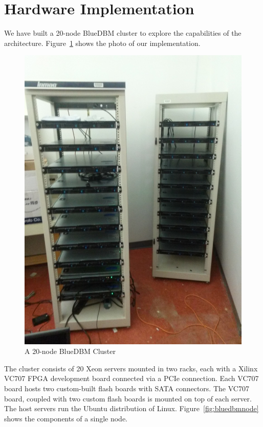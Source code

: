 \section{Hardware Implementation}

We have built a 20-node BlueDBM cluster to explore the capabilities of the
architecture. Figure~\ref{fig:bluedbmcluster} shows the photo of our
implementation.

\begin{figure}[ht]
	\begin{center}
	\includegraphics[width=0.3\paperwidth]{figures/rack.jpg}
	\caption{A 20-node BlueDBM Cluster}
	\label{fig:bluedbmcluster}
	\end{center}
\end{figure}

The cluster consists of 20 Xeon servers mounted in two racks, each with a Xilinx
VC707 FPGA development board connected via a PCIe connection. Each VC707 board
hosts two custom-built flash boards with SATA connectors. The VC707 board,
coupled with two custom flash boards is mounted on top of each server.
The host servers run the Ubuntu distribution of Linux.
Figure~\ref{fig:bluedbmnode} shows the components of a single node.

